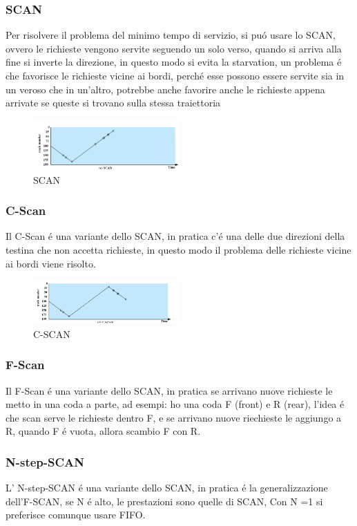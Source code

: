 \subsubsection*{SCAN}
Per risolvere il problema del minimo tempo di servizio, si puó usare lo SCAN, ovvero le richieste
vengono servite seguendo un solo verso, quando si arriva alla fine si inverte la direzione, in questo modo
si evita la starvation, un problema é che favorisce le richieste vicine ai bordi, perché esse possono essere servite
sia in un veroso che in un'altro, potrebbe anche favorire anche le richieste appena arrivate se queste si trovano sulla stessa
traiettoria 
\begin{figure}
    \centering
    \includegraphics[width=0.5\textwidth]{immagini/SCAN}
    \caption{SCAN}
\end{figure}
\subsubsection*{C-Scan}
Il C-Scan é una variante dello SCAN, in pratica c'é una delle due direzioni della testina che non accetta richieste,
in questo modo il problema delle richieste vicine ai bordi viene risolto.
\begin{figure}[H]
    \centering
    \includegraphics[width=0.5\textwidth]{immagini/C_Scan}
    \caption{C-SCAN}
\end{figure}
\subsubsection*{F-Scan}
Il F-Scan é una variante dello SCAN, in pratica se arrivano nuove richieste le metto in una coda a parte, ad esempi:
ho una coda F (front) e R (rear), l'idea é che scan serve le richieste dentro F, e se arrivano nuove riechieste le
aggiungo a R, quando F é vuota, allora scambio F con R.
\subsubsection*{N-step-SCAN}
L' N-step-SCAN é una variante dello SCAN, in pratica é la generalizzazione dell'F-SCAN, se N é alto, le prestazioni sono
quelle di SCAN, Con N =1 si preferisce comunque usare FIFO.
